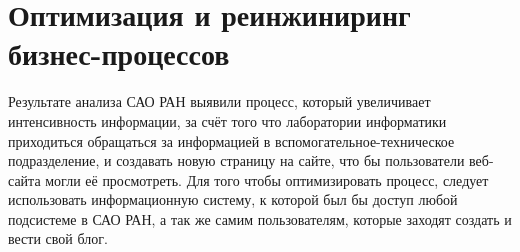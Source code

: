 \section{Оптимизация и реинжиниринг бизнес-процессов}

Результате анализа САО РАН выявили процесс, который увеличивает интенсивность информации, за счёт того что лаборатории информатики приходиться обращаться за информацией в вспомогательное-техническое подразделение, и создавать новую страницу на сайте, что бы пользователи веб-сайта могли её просмотреть. Для того чтобы оптимизировать процесс, следует использовать информационную систему, к которой был бы доступ любой подсистеме в САО РАН, а так же самим пользователям, которые заходят создать и вести свой блог.
\pagebreak